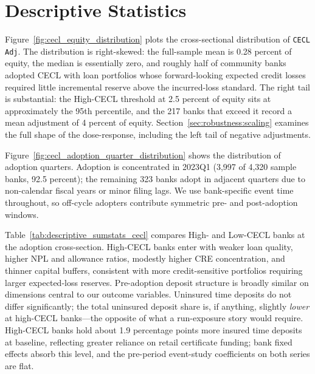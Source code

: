 \section{Descriptive Statistics}
\label{sec:descriptive}

Figure~\ref{fig:cecl_equity_distribution} plots the cross-sectional
distribution of \texttt{CECL Adj}.  The distribution is right-skewed:
the full-sample mean is 0.28 percent of equity, the median is
essentially zero, and roughly half of community banks adopted CECL with
loan portfolios whose forward-looking expected credit losses required
little incremental reserve above the incurred-loss standard.  The right
tail is substantial: the High-CECL threshold at 2.5 percent of equity
sits at approximately the 95th percentile, and the 217 banks that
exceed it record a mean adjustment of 4 percent of equity.
Section~\ref{sec:robustness:scaling} examines the full shape of the
dose-response, including the left tail of negative adjustments.

Figure~\ref{fig:cecl_adoption_quarter_distribution} shows the
distribution of adoption quarters.  Adoption is concentrated in 2023Q1
(3,997 of 4,320 sample banks, 92.5 percent); the remaining 323 banks
adopt in adjacent quarters due to non-calendar fiscal years or minor
filing lags.  We use bank-specific event time throughout, so off-cycle
adopters contribute symmetric pre- and post-adoption windows.

Table~\ref{tab:descriptive_sumstats_cecl} compares High- and Low-CECL
banks at the adoption cross-section.  High-CECL banks enter with weaker
loan quality, higher NPL and allowance ratios, modestly higher CRE
concentration, and thinner capital buffers, consistent with more
credit-sensitive portfolios requiring larger expected-loss reserves.
Pre-adoption deposit structure is broadly similar on dimensions central
to our outcome variables.  Uninsured time deposits do not differ
significantly; the total uninsured deposit share is, if anything,
slightly \emph{lower} at high-CECL banks---the opposite of what a
run-exposure story would require.  High-CECL banks hold about 1.9
percentage points more insured time deposits at baseline, reflecting
greater reliance on retail certificate funding; bank fixed effects
absorb this level, and the pre-period event-study coefficients on both
series are flat.

